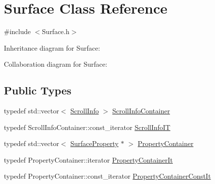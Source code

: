 \hypertarget{classSurface}{}\section{Surface Class Reference}
\label{classSurface}


{\ttfamily \#include $<$Surface.\+h$>$}



Inheritance diagram for Surface\+:


Collaboration diagram for Surface\+:
\subsection*{Public Types}
\begin{DoxyCompactItemize}
\item 
typedef std\+::vector$<$ \hyperlink{structScrollInfo}{Scroll\+Info} $>$ \hyperlink{classSurface_a7b781fa8ee9f22afe59f5aa871fd7b6e}{Scroll\+Info\+Container}
\item 
typedef Scroll\+Info\+Container\+::const\+\_\+iterator \hyperlink{classSurface_a603071753114924b36bdba9241010984}{Scroll\+Info\+IT}
\item 
typedef std\+::vector$<$ \hyperlink{classSurfaceProperty}{Surface\+Property} $\ast$ $>$ \hyperlink{classSurface_a7890ba0bba332887c7511468f10a8e85}{Property\+Container}
\item 
typedef Property\+Container\+::iterator \hyperlink{classSurface_a828990970629ddd1207584544daaca7f}{Property\+Container\+It}
\item 
typedef Property\+Container\+::const\+\_\+iterator \hyperlink{classSurface_ab30c0b6e5e6119d88e09c50c71632819}{Property\+Container\+Const\+It}
\end{DoxyCompactItemize}
